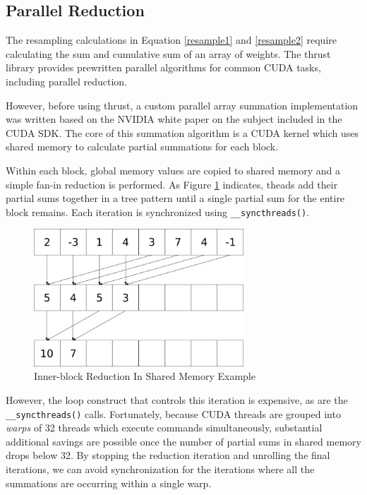 \documentclass{article}
\begin{document}
\subsection{Parallel Reduction}
The resampling calculations in Equation \ref{resample1} and \ref{resample2} require calculating the sum and cumulative sum of an array of weights. The thrust library provides prewritten parallel algorithms for common CUDA tasks, including parallel reduction.\cite{thrust}

However, before using thrust, a custom parallel array summation implementation was written based on the NVIDIA white paper on the subject included in the CUDA SDK.\cite{oprc} The core of this summation algorithm is a CUDA kernel which uses shared memory to calculate partial summations for each block.

Within each block, global memory values are copied to shared memory and a simple fan-in reduction is performed. As Figure \ref{sum1} indicates, theads add their partial sums together in a tree pattern until a single partial sum for the entire block remains. Each iteration is synchronized using \verb!__syncthreads()!.

\begin{figure}
\centering
\includegraphics[width=0.7\textwidth]{data/summation.png}
\caption{Inner-block Reduction In Shared Memory Example}
\label{sum1}
\end{figure}


However, the loop construct that controls this iteration is expensive, as are the \verb!__syncthreads()! calls. Fortunately, because CUDA threads are grouped into \emph{warps} of 32 threads which execute commands simultaneously, substantial additional savings are possible once the number of partial sums in shared memory drops below 32. By stopping the reduction iteration and unrolling the final iterations, we can avoid synchronization for the iterations where all the summations are occurring within a single warp.
\end{document}
